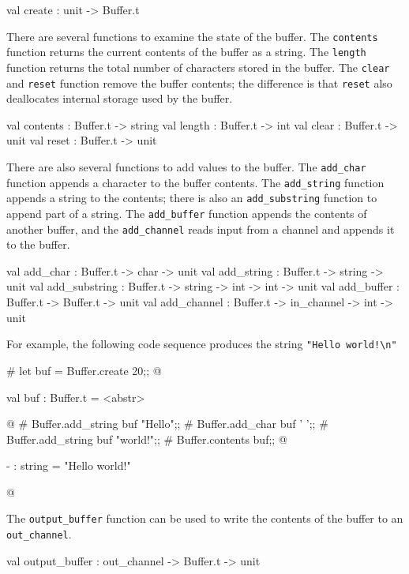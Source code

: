 \begin{ocaml}
val create : unit -> Buffer.t
\end{ocaml}
%
There are several functions to examine the state of the buffer. The \hbox{\lstinline$contents$}
function returns the current contents of the buffer as a string. The \hbox{\lstinline$length$}
function returns the total number of characters stored in the buffer. The \hbox{\lstinline$clear$}
and \hbox{\lstinline$reset$} function remove the buffer contents; the difference is
that \hbox{\lstinline$reset$} also deallocates internal storage used by the buffer.

\begin{ocaml}
val contents : Buffer.t -> string
val length : Buffer.t -> int
val clear : Buffer.t -> unit
val reset : Buffer.t -> unit
\end{ocaml}
%
There are also several functions to add values to the buffer. The \hbox{\lstinline/add_char/}
function appends a character to the buffer contents. The \hbox{\lstinline/add_string/} function
appends a string to the contents; there is also an \hbox{\lstinline/add_substring/} function to
append part of a string. The \hbox{\lstinline/add_buffer/} function appends the contents of another
buffer, and the \hbox{\lstinline/add_channel/} reads input from a channel and appends it to the
buffer.

\begin{ocaml}
val add_char : Buffer.t -> char -> unit
val add_string : Buffer.t -> string -> unit
val add_substring : Buffer.t -> string -> int -> int -> unit
val add_buffer : Buffer.t -> Buffer.t -> unit
val add_channel : Buffer.t -> in_channel -> int -> unit
\end{ocaml}
%
For example, the following code sequence produces the string
\hbox{\lstinline+"Hello world!\n"+}
%
\begin{ocaml}
# let buf = Buffer.create 20;;
@
\begin{topoutput}
val buf : Buffer.t = <abstr>
\end{topoutput}
@
# Buffer.add_string buf "Hello";;
# Buffer.add_char buf ' ';;
# Buffer.add_string buf "world!\n";;
# Buffer.contents buf;;
@
\begin{topoutput}
- : string = "Hello world!\n"
\end{topoutput}
@
\end{ocaml}
%
The \hbox{\lstinline/output_buffer/} function can be used to write the
contents of the buffer to an \hbox{\lstinline/out_channel/}.

\begin{ocaml}
val output_buffer : out_channel -> Buffer.t -> unit
\end{ocaml}

